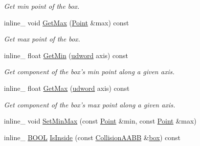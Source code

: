 \begin{DoxyCompactItemize}
\begin{DoxyCompactList}\small\item\em Get min point of the box. \end{DoxyCompactList}\item 
\hypertarget{class_collision_a_a_b_b_a3a6017937a77b1f2b0c85ef65e4e2b68}{inline\+\_\+ void \hyperlink{class_collision_a_a_b_b_a3a6017937a77b1f2b0c85ef65e4e2b68}{Get\+Max} (\hyperlink{class_point}{Point} \&max) const }\label{class_collision_a_a_b_b_a3a6017937a77b1f2b0c85ef65e4e2b68}

\begin{DoxyCompactList}\small\item\em Get max point of the box. \end{DoxyCompactList}\item 
\hypertarget{class_collision_a_a_b_b_a5d0562b18a2f9c1b6650497418151d2b}{inline\+\_\+ float \hyperlink{class_collision_a_a_b_b_a5d0562b18a2f9c1b6650497418151d2b}{Get\+Min} (\hyperlink{_ice_types_8h_a44c6f1920ba5551225fb534f9d1a1733}{udword} axis) const }\label{class_collision_a_a_b_b_a5d0562b18a2f9c1b6650497418151d2b}

\begin{DoxyCompactList}\small\item\em Get component of the box's min point along a given axis. \end{DoxyCompactList}\item 
\hypertarget{class_collision_a_a_b_b_a04092d9c71ac7959bdd7e8864759ada2}{inline\+\_\+ float \hyperlink{class_collision_a_a_b_b_a04092d9c71ac7959bdd7e8864759ada2}{Get\+Max} (\hyperlink{_ice_types_8h_a44c6f1920ba5551225fb534f9d1a1733}{udword} axis) const }\label{class_collision_a_a_b_b_a04092d9c71ac7959bdd7e8864759ada2}

\begin{DoxyCompactList}\small\item\em Get component of the box's max point along a given axis. \end{DoxyCompactList}\item 
inline\+\_\+ void \hyperlink{class_collision_a_a_b_b_a77f7c00377db42bc0988a9b882bad296}{Set\+Min\+Max} (const \hyperlink{class_point}{Point} \&min, const \hyperlink{class_point}{Point} \&max)
\item 
inline\+\_\+ \hyperlink{_ice_types_8h_a050c65e107f0c828f856a231f4b4e788}{B\+O\+O\+L} \hyperlink{class_collision_a_a_b_b_a108349eb75dbdebc7444b35e3e40aa46}{Is\+Inside} (const \hyperlink{class_collision_a_a_b_b}{Collision\+A\+A\+B\+B} \&\hyperlink{structbox}{box}) const 
\end{DoxyCompactItemize}
